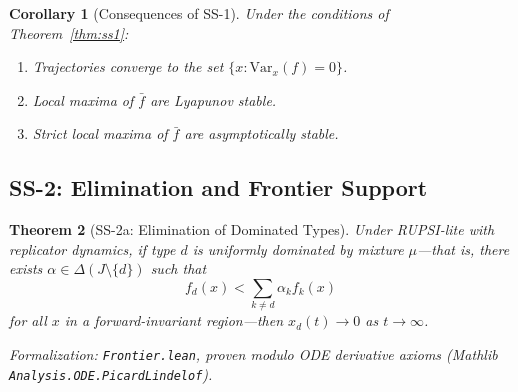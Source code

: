\documentclass[12pt]{article}
\newtheorem{theorem}{Theorem}[section]
\newtheorem{corollary}[theorem]{Corollary}
\newcommand{\Var}{\mathrm{Var}}
\begin{document}
\begin{corollary}[Consequences of SS-1]
\label{cor:ss1}
Under the conditions of Theorem~\ref{thm:ss1}:
\begin{enumerate}
    \item Trajectories converge to the set $\{x : \Var_x(f) = 0\}$.
    \item Local maxima of $\bar{f}$ are Lyapunov stable.
    \item Strict local maxima of $\bar{f}$ are asymptotically stable.
\end{enumerate}
\end{corollary}

\subsection{SS-2: Elimination and Frontier Support}

\begin{theorem}[SS-2a: Elimination of Dominated Types]
\label{thm:ss2a}
Under RUPSI-lite with replicator dynamics, if type $d$ is uniformly dominated by mixture $\mu$---that is, there exists $\alpha \in \Delta(J \setminus \{d\})$ such that
\[
f_d(x) < \sum_{k \neq d} \alpha_k f_k(x)
\]
for all $x$ in a forward-invariant region---then $x_d(t) \to 0$ as $t \to \infty$.
\end{theorem}
\noindent\textit{Formalization: \texttt{Frontier.lean}, proven modulo ODE derivative axioms (Mathlib \texttt{Analysis.ODE.PicardLindelof}).}
\end{document}
